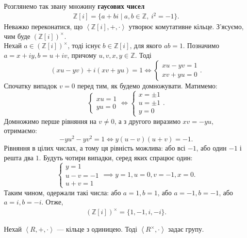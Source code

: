 \documentclass{math_library}
\begin{document}
\begin{example}
Розглянемо так звану множину \textbf{гаусових чисел}
\begin{align*}
\mathbb{Z}[i] = \{ a + bi \mid a,b \in \mathbb{Z},\ i^2 = -1 \}.
\end{align*}
Неважко переконатися, що $\left< \mathbb{Z}[i], +, \cdot \right>$ утворює комутативне кільце. З'ясуємо, чим буде $(\mathbb{Z}[i])^\times$.
\bigskip \\
Нехай $a \in (\mathbb{Z}[i])^\times$, тоді існує $b \in \mathbb{Z}[i]$, для якого $ab = 1$. Позначимо $a = x+iy, b = u+iv$, причому $u,v,x,y \in \mathbb{Z}$. Тоді
\[
(xu-yv) + i(xv+yu) = 1 \iff \begin{cases} xu - yv = 1 \\ xv + yu = 0 \end{cases}.
\]
Спочатку випадок $v = 0$ перед тим, як будемо домножувати. Матимемо:
\[
\begin{cases} xu = 1 \\ yu = 0 \end{cases} \iff \begin{cases} x = \pm 1 \\ u = \pm 1 \\ y = 0 \end{cases}.
\]
Домножимо перше рівняння на $v \neq 0$, а з другого виразимо $xv = -yu$, отримаємо:
\[
-yu^2 - yv^2 = 1 \iff y(u-v)(u+v) = -1.
\]
Рівняння в цілих числах, а тому ця рівність можлива: або всі $-1$, або один $-1$ і решта два $1$. Будуть чотири випадки, серед яких спрацює один:
\[
\begin{cases} 
y = 1 \\
u - v = -1 \\
u + v = 1
\end{cases} \implies y = 1, u = 0, v = -1, x = 0.
\]
Таким чином, одержали такі числа: або $a = 1, b = 1$, або $a = -1, b = -1$, або $a = i, b = -i$. Отже,
\begin{align*}
(\mathbb{Z}[i])^\times = \{1,-1,i,-i\}.
\end{align*}
\end{example}

\begin{theorem}
Нехай $\left<R,+,\cdot \right>$ --- кільце з одиницею. Тоді $\left<R^\times, \cdot \right>$ задає групу.
\end{theorem}
\end{document}
